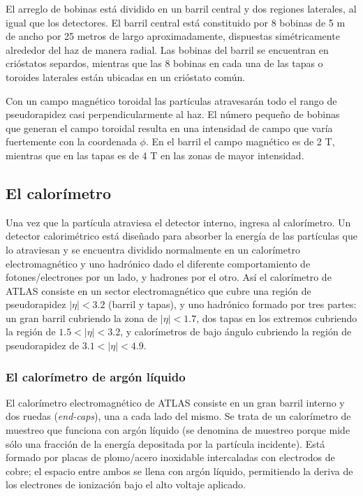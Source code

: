    El arreglo de bobinas est\'a dividido en un barril central y dos regiones laterales, al igual que los detectores. El barril central est\'a constituido por 8 bobinas de 5 m de ancho por 25 metros de largo aproximadamente, dispuestas sim\'etricamente alrededor del haz de manera radial. Las bobinas del barril se encuentran en cri\'ostatos separdos, mientras que las 8 bobinas en cada una de las tapas o toroides laterales est\'an ubicadas en un cri\'ostato com\'un.

   Con un campo magn\'etico toroidal las part\'iculas atravesar\'an todo el rango de pseudorapidez casi perpendicularmente al haz. El n\'umero peque\~no de bobinas que generan el campo toroidal resulta en una intensidad de campo que var\'ia fuertemente con la coordenada $\phi$. En el barril el campo magn\'etico es de 2 T, mientras que en las tapas es de 4 T en las zonas de mayor intensidad.   
    
\subsection{El calor\'imetro}

   Una vez que la part\'icula atraviesa el detector interno, ingresa al calor\'imetro. Un detector calorim\'etrico est\'a dise\~nado para absorber la energ\'ia de las part\'iculas que lo atraviesan y se encuentra dividido normalmente en un calor\'imetro electromagn\'etico y uno hadr\'onico dado el diferente comportamiento de fotones/electrones por un lado, y hadrones por el otro.  As\'i el calor\'imetro de ATLAS consiste en un sector electromagn\'etico que cubre una regi\'on de pseudorapidez $|\eta|<3.2$ (barril y tapas),  y uno hadr\'onico formado por tres partes: un gran barril cubriendo la zona de $|\eta|<1.7$, dos tapas en los extremos cubriendo la regi\'on de $1.5<|\eta|<3.2$, y calor\'imetros de bajo \'angulo cubriendo la regi\'on de pseudorapidez de  $3.1 <|\eta|< 4.9$. %

\subsubsection{El calor\'imetro de arg\'on l\'iquido}
  
   El calor\'imetro electromagn\'etico de ATLAS consiste en un gran barril interno y dos ruedas (\emph{end-caps}), una a cada lado del mismo. Se trata de un calor\'imetro de muestreo que funciona con arg\'on l\'iquido (se denomina de muestreo porque mide s\'olo una fracci\'on de la energ\'ia depositada por la part\'icula incidente). Est\'a formado por placas de plomo/acero inoxidable intercaladas con electrodos de cobre; el espacio entre ambos se llena con arg\'on l\'iquido, permitiendo la deriva de los electrones de ionizaci\'on bajo el alto voltaje aplicado. 

